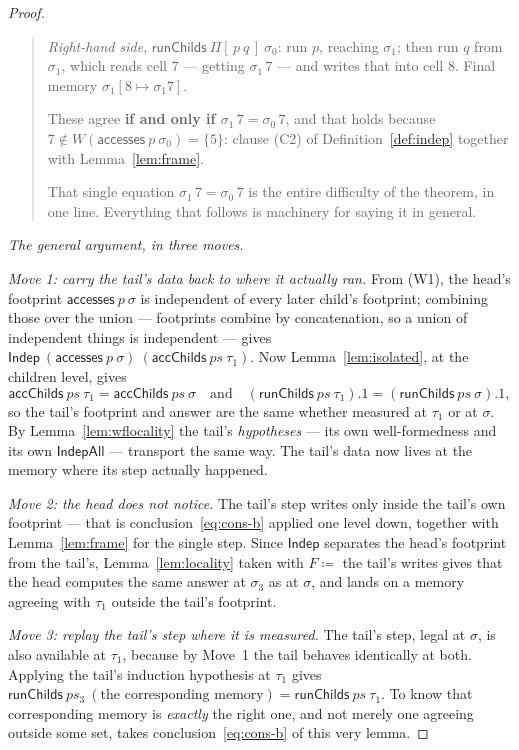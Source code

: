 \documentclass[11pt,a4paper]{article}
\theoremstyle{definition}
\theoremstyle{plain}
\theoremstyle{remark}
\newcommand{\st}{\sigma}
\newcommand{\writes}[1]{W(#1)}
\newcommand{\acc}{\mathsf{accesses}}
\newcommand{\Indep}{\mathsf{Indep}}
\newcommand{\upd}[3]{#1[#2 \mapsto #3]}
\begin{document}
\begin{proof}
\begin{quote}
\emph{Right-hand side}, $\mathsf{runChilds}\ \Pi[\,p\ q\,]\ \st_0$: run $p$, reaching
$\st_1$; then run $q$ from $\st_1$, which reads cell $7$ --- getting $\st_1\,7$ --- and writes
that into cell $8$. Final memory $\upd{\st_1}{8}{\st_1 7}$.

These agree \textbf{if and only if $\st_1\,7 = \st_0\,7$}, and that holds because
$7 \notin \writes{\acc\ p\ \st_0} = \{5\}$: clause (C2) of Definition~\ref{def:indep} together
with Lemma~\ref{lem:frame}.

That single equation $\st_1\,7 = \st_0\,7$ is the entire difficulty of the theorem, in one
line. Everything that follows is machinery for saying it in general.
\end{quote}

\emph{The general argument, in three moves.}

\emph{Move 1: carry the tail's data back to where it actually ran.} From (W1), the head's
footprint $\acc\ p\ \st$ is independent of every later child's footprint; combining those
over the union --- footprints combine by concatenation, so a union of independent things is
independent --- gives $\Indep\ (\acc\ p\ \st)\ (\mathsf{accChilds}\ ps\ \tau_1)$. Now
Lemma~\ref{lem:isolated}, at the children level, gives
\[
  \mathsf{accChilds}\ ps\ \tau_1 = \mathsf{accChilds}\ ps\ \st
  \quad\text{and}\quad
  (\mathsf{runChilds}\ ps\ \tau_1).1 = (\mathsf{runChilds}\ ps\ \st).1 ,
\]
so the tail's footprint and answer are the same whether measured at $\tau_1$ or at $\st$. By
Lemma~\ref{lem:wflocality} the tail's \emph{hypotheses} --- its own well-formedness and its
own $\mathsf{IndepAll}$ --- transport the same way. The tail's data now lives at the memory
where its step actually happened.

\emph{Move 2: the head does not notice.} The tail's step writes only inside the tail's own
footprint --- that is conclusion~\eqref{eq:cons-b} applied one level down, together with
Lemma~\ref{lem:frame} for the single step. Since $\Indep$ separates the head's footprint from
the tail's, Lemma~\ref{lem:locality} taken with $F \coloneqq$ the tail's writes gives that the
head computes the same answer at $\st_3$ as at $\st$, and lands on a memory agreeing with
$\tau_1$ outside the tail's footprint.

\emph{Move 3: replay the tail's step where it is measured.} The tail's step, legal at $\st$,
is also available at $\tau_1$, because by Move~1 the tail behaves identically at both.
Applying the tail's induction hypothesis at $\tau_1$ gives
$\mathsf{runChilds}\ ps_3\ (\text{the corresponding memory}) = \mathsf{runChilds}\ ps\ \tau_1$.
To know that corresponding memory is \emph{exactly} the right one, and not merely one
agreeing outside some set, takes conclusion~\eqref{eq:cons-b} of this very lemma.
\end{proof}
\end{document}
